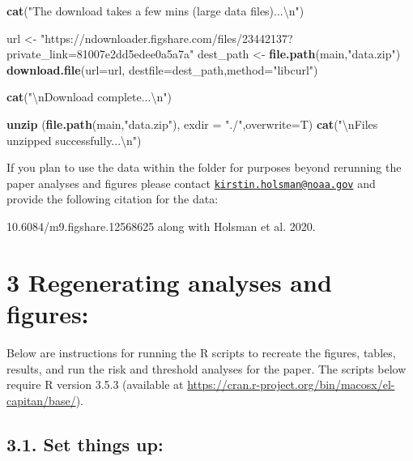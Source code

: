 \documentclass[]{article}
\newenvironment{Shaded}{\begin{snugshade}}{\end{snugshade}}
\newcommand{\KeywordTok}[1]{\textcolor[rgb]{0.13,0.29,0.53}{\textbf{{#1}}}}
\newcommand{\DataTypeTok}[1]{\textcolor[rgb]{0.13,0.29,0.53}{{#1}}}
\newcommand{\CharTok}[1]{\textcolor[rgb]{0.31,0.60,0.02}{{#1}}}
\newcommand{\StringTok}[1]{\textcolor[rgb]{0.31,0.60,0.02}{{#1}}}
\newcommand{\NormalTok}[1]{{#1}}
\begin{document}
\begin{Shaded}
\begin{Highlighting}[]
    \KeywordTok{cat}\NormalTok{(}\StringTok{"The download takes a few mins (large data files)...}\CharTok{\textbackslash{}n}\StringTok{"}\NormalTok{)}

    \NormalTok{url <-}\StringTok{  "https://ndownloader.figshare.com/files/23442137?private_link=81007e2dd5edee0a5a7a"}
    \NormalTok{dest_path  <-}\StringTok{  }\KeywordTok{file.path}\NormalTok{(main,}\StringTok{"data.zip"}\NormalTok{)}
    \KeywordTok{download.file}\NormalTok{(}\DataTypeTok{url=}\NormalTok{url, }\DataTypeTok{destfile=}\NormalTok{dest_path,}\DataTypeTok{method=}\StringTok{"libcurl"}\NormalTok{)}
    
    \KeywordTok{cat}\NormalTok{(}\StringTok{"}\CharTok{\textbackslash{}n}\StringTok{Download complete...}\CharTok{\textbackslash{}n}\StringTok{"}\NormalTok{)}
    
    \KeywordTok{unzip} \NormalTok{(}\KeywordTok{file.path}\NormalTok{(main,}\StringTok{"data.zip"}\NormalTok{), }\DataTypeTok{exdir =} \StringTok{"./"}\NormalTok{,}\DataTypeTok{overwrite=}\NormalTok{T)}
    \KeywordTok{cat}\NormalTok{(}\StringTok{"}\CharTok{\textbackslash{}n}\StringTok{Files unzipped successfully...}\CharTok{\textbackslash{}n}\StringTok{"}\NormalTok{)}
\end{Highlighting}
\end{Shaded}

If you plan to use the data within the folder for purposes beyond
rerunning the paper analyses and figures please contact
\href{mailto:kirstin.holsman@noaa.gov}{\nolinkurl{kirstin.holsman@noaa.gov}}
and provide the following citation for the data:

10.6084/m9.figshare.12568625 along with Holsman et al. 2020.

\section{3 Regenerating analyses and
figures:}\label{regenerating-analyses-and-figures}

Below are instructions for running the R scripts to recreate the
figures, tables, results, and run the risk and threshold analyses for
the paper. The scripts below require R version 3.5.3 (available at
\url{https://cran.r-project.org/bin/macosx/el-capitan/base/}).

\subsection{3.1. Set things up:}\label{set-things-up}
\end{document}
